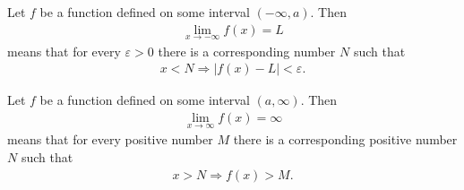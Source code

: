 \documentclass{article}
\begin{document}
\begin{definition}
	Let $f$ be a function defined on some interval $(-\infty, a)$. Then
	\begin{align*}
		\lim_{x\to-\infty}f(x)=L
	\end{align*}
	means that for every $\varepsilon>0$ there is a corresponding number $N$ such that
	\begin{align*}
		x<N\Rightarrow |f(x)-L|<\varepsilon.
	\end{align*}
\end{definition}
\begin{definition}
	Let $f$ be a function defined on some interval $(a, \infty)$. Then
	\begin{align*}
		\lim_{x\to\infty}f(x)=\infty
	\end{align*}
	means that for every positive number $M$ there is a corresponding positive number $N$ such that
	\begin{align*}
		x>N\Rightarrow f(x)>M.
	\end{align*}
\end{definition}
\end{document}
